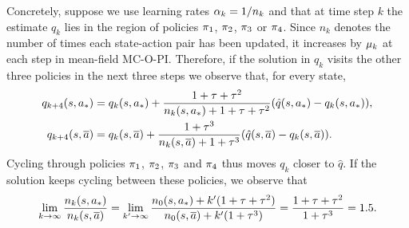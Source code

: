 Concretely, suppose we use learning rates $\alpha_k = 1/n_k$ and that at time step $k$ the estimate $q_k$ lies in the region of policies $\pi_1$, $\pi_2$, $\pi_3$ or $\pi_4$.
Since $n_k$ denotes the number of times each state-action pair has been updated, it increases by $\mu_k$ at each step in mean-field MC-O-PI.
Therefore, if the solution in $q_k$ visits the other three policies in the next three steps we observe that, for every state,
\begin{align}
    \label{eq: interpolation s-best}
    q_{k+4}(s, {a}_*) 
    &= q_k(s, {a}_*)
    +
    \dfrac{1 + \tau + \tau^2}{n_k(s,{a}_*) + 1 + \tau + \tau^2} ( \hat{q}(s, {a}_*) - q_k(s, {a}_*) ) ,
    \\
    \label{eq: interpolation s-worst}
    q_{k+4}(s, \overline{a}) 
    &= q_k(s, \overline{a})
    +
    \dfrac{1+\tau^3}{n_k(s,\overline{a}) + 1 + \tau^3} ( \hat{q}(s, \overline{a}) - q_k(s, \overline{a}) ) .
\end{align}
Cycling through policies $\pi_1$, $\pi_2$, $\pi_3$ and $\pi_4$ thus moves $q_k$ closer to $\hat{q}$.
If the solution keeps cycling between these policies, we observe that
\begin{align*}
    \lim_{k \to \infty} \dfrac{n_k(s, {a}_*)}{n_k(s, \overline{a})}
    =
    \lim_{k' \to \infty}
    \dfrac{n_0(s,{a}_*) + k' ( 1 + \tau + \tau^2 ) }{n_0(s,\overline{a}) + k'(1 + \tau^3) } 
    = \dfrac{1 + \tau + \tau^2}{1 + \tau^3}
    = 1.5 .
\end{align*}

